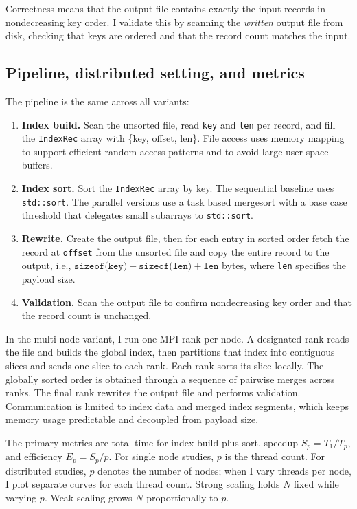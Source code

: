 \documentclass[12pt]{article}
\begin{document}
Correctness means that the output file contains exactly the input records in nondecreasing key order. I validate this by scanning the \emph{written} output file from disk, checking that keys are ordered and that the record count matches the input.

\subsection{Pipeline, distributed setting, and metrics}
The pipeline is the same across all variants:
\begin{enumerate}
  \item \textbf{Index build.} Scan the unsorted file, read \texttt{key} and \texttt{len} per record, and fill the \texttt{IndexRec} array with \{key, offset, len\}. File access uses memory mapping to support efficient random access patterns and to avoid large user space buffers.
  \item \textbf{Index sort.} Sort the \texttt{IndexRec} array by key. The sequential baseline uses \texttt{std::sort}. The parallel versions use a task based mergesort with a base case threshold that delegates small subarrays to \texttt{std::sort}.
  \item \textbf{Rewrite.} Create the output file, then for each entry in sorted order fetch the record at \texttt{offset} from the unsorted file and copy the entire record to the output, i.e., \(\texttt{sizeof(key)}+\texttt{sizeof(len)}+\texttt{len}\) bytes, where \texttt{len} specifies the payload size.
  \item \textbf{Validation.} Scan the output file to confirm nondecreasing key order and that the record count is unchanged.
\end{enumerate}

In the multi node variant, I run one MPI rank per node. A designated rank reads the file and builds the global index, then partitions that index into contiguous slices and sends one slice to each rank. Each rank sorts its slice locally. The globally sorted order is obtained through a sequence of pairwise merges across ranks. The final rank rewrites the output file and performs validation. Communication is limited to index data and merged index segments, which keeps memory usage predictable and decoupled from payload size.

The primary metrics are total time for index build plus sort, speedup \(S_p = T_1 / T_p\), and efficiency \(E_p = S_p / p\). For single node studies, \(p\) is the thread count. For distributed studies, \(p\) denotes the number of nodes; when I vary threads per node, I plot separate curves for each thread count. Strong scaling holds \(N\) fixed while varying \(p\). Weak scaling grows \(N\) proportionally to \(p\).
\end{document}
